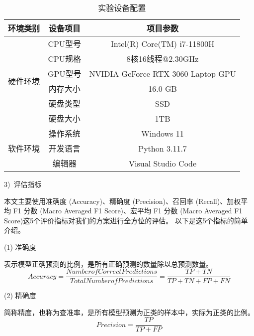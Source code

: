 \begin{table}[htbp]
	\caption{实验设备配置}
	\label{tab:env_setting}
	\centering
	\begin{tabular}{ccc}
		\toprule
		\textbf{环境类别}         & \textbf{设备项目} & \textbf{项目参数}                  \\
		\midrule
		\multirow{6}{*}{硬件环境} & CPU型号           & Intel(R) Core(TM) i7-11800H        \\
		                          & CPU规格           & 8核16线程@2.30GHz                  \\
		                          & GPU型号           & NVIDIA GeForce RTX 3060 Laptop GPU \\
		                          & 内存大小          & 16.0 GB                            \\
		                          & 硬盘类型          & SSD                                \\
		                          & 硬盘大小          & 1TB                                \\
		\hline
		\multirow{3}{*}{软件环境} & 操作系统          & Windows 11                         \\
		                          & 开发语言          & Python 3.11.7                      \\
		                          & 编辑器            & Visual Studio Code                 \\
		\bottomrule
	\end{tabular}
\end{table}

3)~评估指标\par
本文主要使用准确度 (Accuracy)、精确度 (Precision)、召回率 (Recall)、加权平均 F1 分数 (Macro Averaged F1 Score)、宏平均 F1 分数 (Macro Averaged F1 Score)这5个评价指标对我们的方案进行全方位的评估。
以下是这5个指标的简单介绍。\par
(1) 准确度\par
表示模型正确预测的比例，是所有正确预测的数量除以总预测数量。
\begin{equation}
	\label{eq:val_score1}
	Accuracy = \frac{Number of Correct Predictions}{Total Number of Predictions} = \frac{TP + TN}{TP + TN + FP + FN}
\end{equation}

(2) 精确度\par
简称精度，也称为查准率，是所有模型预测为正类的样本中，实际为正类的比例。
\begin{equation}
	\label{eq:val_score2}
	Precision = \frac{TP}{TP + FP}
\end{equation}

